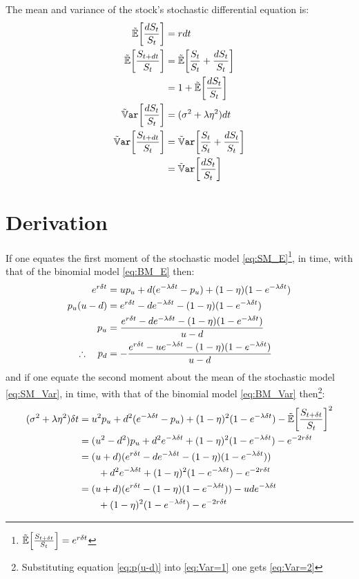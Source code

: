 \documentclass[a4paper,11pt,oneside]{report}
\theoremstyle{plain}
\theoremstyle{definition}
\begin{document}
The mean and variance of the stock's stochastic differential equation is:
\begin{align}
 \E[\frac{\dS}{\S}]    &= r\dt \\
 \E[\frac{\Sdt}{\S}]   &= \E[\frac{\S}{\S} + \frac{\dS}{\S}] \n
                       &= 1 + \E[\frac{\dS}{\S}] \label{eq:SM_E} \\
 \Var[\frac{\dS}{\S}]  &= (\sigma^2 + \lambda\eta^2)\dt \\
 \Var[\frac{\Sdt}{\S}] &= \Var[\frac{\S}{\S} + \frac{\dS}{\S}] \n
                       &= \Var[\frac{\dS}{\S}] \label{eq:SM_Var}
\end{align}



\section{Derivation}
If one equates the first moment of the stochastic model \eqref{eq:SM_E}\footnote{$\E[\frac{\SDt}{\S}] = e^{r\Dt}$}, in \Dt time, with that of the binomial model \eqref{eq:BM_E} then:
\begin{align}
 e^{r\delta t}       &= up_u + d(e^{-\lambda\delta t} - p_u) + (1 - \eta)(1 - e^{-\lambda\delta t}) \nonumber\\
 p_u(u - d)   &= e^{r\delta t} - d e^{-\lambda\delta t} - (1 - \eta)(1 - e^{-\lambda\delta t}) \label{eq:p(u-d)}\\
 p_u            &= \frac{e^{r\delta t} - d e^{-\lambda\delta t} - (1 - \eta)(1 - e^{-\lambda\delta t})}{u - d} \\
 \therefore\quad p_d &= -\frac{e^{r\delta t} - u e^{-\lambda\delta t} - (1 - \eta)(1 - e^{-\lambda\delta t})}{u - d}
\end{align}
and if one equate the second moment about the mean of the stochastic model \eqref{eq:SM_Var}, in \Dt time, with that of the binomial model \eqref{eq:BM_Var} then\footnote{Substituting equation \eqref{eq:p(u-d)} into \eqref{eq:Var=1} one gets \eqref{eq:Var=2}}:
\begin{align}
 (\sigma^2 + \lambda\eta^2)\Dt &= \u^2\pu + \d^2(e^{-\lambda\Dt} - \pu) + (1 - \eta)^2(1 - e^{-\lambda\Dt}) - \E[\frac{\SDt}{\S}]^2 \n
                        &= (\u^2 - \d^2)\pu + \d^2 e^{-\lambda\Dt} +  (1 - \eta)^2(1 - e^{-\lambda\Dt}) - e^{-2r\Dt} \label{eq:Var=1} \\
                        &= (\u + \d)(e^{r\Dt} - \d e^{-\lambda\Dt} - (1 - \eta)(1 - e^{-\lambda\Dt})) \label{eq:Var=2} \\
                        &\qquad + \d^2 e^{-\lambda\Dt} + (1 - \eta)^2(1 - e^{-\lambda\Dt}) - e^{-2r\Dt} \n
                        &= (\u + \d)(e^{r\Dt} - (1 - \eta)(1 - e^{-\lambda\Dt})) - \u\d e^{-\lambda\Dt} \label{eq:Var=} \\
                        &\qquad + (1 - \eta)^2(1 - e^{-\lambda\Dt}) - e^{-2r\Dt} \nonumber
\end{align}
\end{document}
